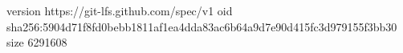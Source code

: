 version https://git-lfs.github.com/spec/v1
oid sha256:5904d71f8fd0bebb1811af1ea4dda83ac6b64a9d7e90d415fc3d979155f3bb30
size 6291608
